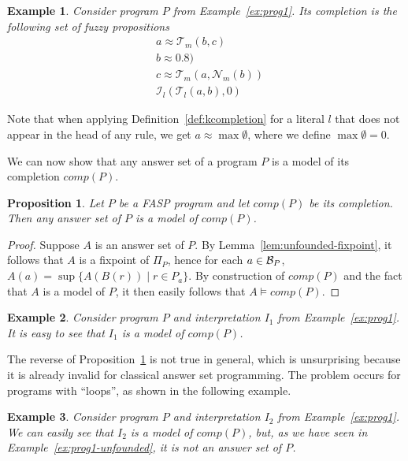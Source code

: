 \documentclass{tlp}
\newcommand{\hbase}[1]{{\ensuremath{{\cal B}_{#1}}}}
\newcommand{\body}[1]{\ensuremath{B(#1)}}
\newcommand{\comp}[1]{\ensuremath{comp(#1)}}
\newcommand{\fneg}[2]{\ensuremath{\mathcal{N}_{#1}(#2)}}
\newcommand{\mneg}[1]{\fneg{m}{#1}}
\newcommand{\feq}{\ensuremath{\approx}}
\newcommand{\pretnorm}{\mathcal{T}}
\newcommand{\prefimp}{\mathcal{I}}
\newcommand{\nfimcons}[1]{\Pi_{#1}}
\newtheorem{example}{Example}
\newtheorem{proposition}{Proposition}
\begin{document}
\begin{example}\label{ex:prog1-completion}
 Consider program $P$ from Example~\ref{ex:prog1}. Its completion is the following set of fuzzy propositions
 \begin{align*}
  &a \feq \pretnorm_m(b,c)\\
  &b \feq 0.8)\\
  &c \feq \pretnorm_m(a,\mneg{b})\\
  & \prefimp_l(\pretnorm_l(a,b),0)
 \end{align*}
\end{example}

Note that when applying Definition~\ref{def:kcompletion} for a literal $l$ that does not appear in the head of any rule, we get $a \feq \max \emptyset$, where we define $\max \emptyset = 0$.

We can now show that any answer set of a program $P$ is a model of its completion $\comp{P}$.



\begin{proposition}\label{prop:kansset-is-modelcomp}
 Let $P$ be a FASP program and let $\comp{P}$ be its completion. Then any answer set of $P$
 is a model of $\comp{P}$.
\end{proposition}
\begin{proof}
 Suppose $A$ is an answer set of $P$. By Lemma~\ref{lem:unfounded-fixpoint}, it follows that $A$ is a fixpoint of $\nfimcons{P}$, hence for each $a \in \hbase{P}$, $A(a) = \sup \{ A(\body{r}) \mid r \in P_a \}$. By construction of $\comp{P}$ and the fact that $A$ is a model of $P$, it then easily follows that $A \models \comp{P}$.
\end{proof}

\begin{example}
Consider program $P$ and interpretation $I_{1}$ from Example~\ref{ex:prog1}. It is easy to see that $I_{1}$ is a model of $\comp{P}$.
\end{example}

The reverse of Proposition~\ref{prop:kansset-is-modelcomp} is not true in general, which is unsurprising because it is already invalid for classical answer set programming. The problem occurs for programs with ``loops'', as shown in the following example.

\begin{example}
 Consider program $P$ and interpretation $I_{2}$ from Example~\ref{ex:prog1}. We can easily see that $I_{2}$ is a model of $\comp{P}$, but, as we have seen in Example~\ref{ex:prog1-unfounded}, it is not an answer set of $P$.
\end{example}
\end{document}
